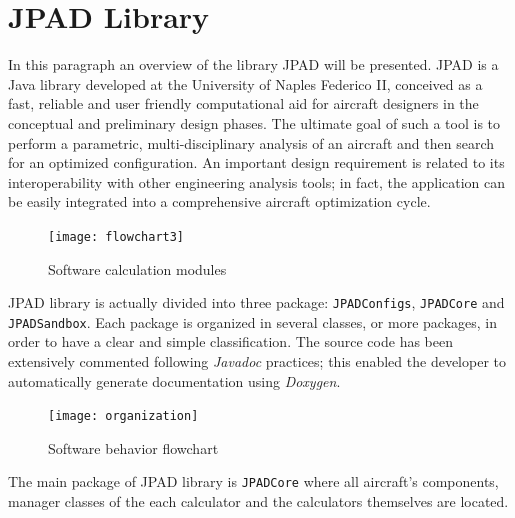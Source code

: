 \section{\gls{JPAD} Library}
In this paragraph an overview of the library \gls{JPAD} will be presented. \gls{JPAD} is a Java library developed at the University of Naples Federico II, conceived as a fast, reliable and user friendly computational aid for aircraft designers in the conceptual and preliminary design phases. The ultimate goal of such a tool is to perform a parametric, multi-disciplinary analysis of an aircraft and then search for an optimized configuration. An important design requirement is related to its interoperability with other engineering analysis tools; in fact, the application can be easily integrated into a comprehensive aircraft optimization cycle. 
%
\begin{figure}[!t]
	\centering
	\texttt{[image: flowchart3]}
	\caption{Software calculation modules}
	\label{fig:guiStart}
\end{figure}

\noindent
\gls{JPAD} library is actually divided into three package: \lstinline[language=Java]!JPADConfigs!, \lstinline[language=Java]!JPADCore! and \lstinline[language=Java]!JPADSandbox!. Each package is organized in several classes, or more packages, in order to have a clear and simple classification. The source code has been extensively commented following \emph{Javadoc} practices; this enabled the developer to automatically generate documentation using \emph{Doxygen}\cite{doxgen}.
%
\begin{figure}[!b]
	\centering
	\texttt{[image: organization]}
	\caption{Software behavior flowchart}
	\label{fig:sw}
\end{figure}
%
The main package of \gls{JPAD} library is \lstinline[language=Java]!JPADCore! where all aircraft's components, manager classes of the each calculator and the calculators themselves are located.

